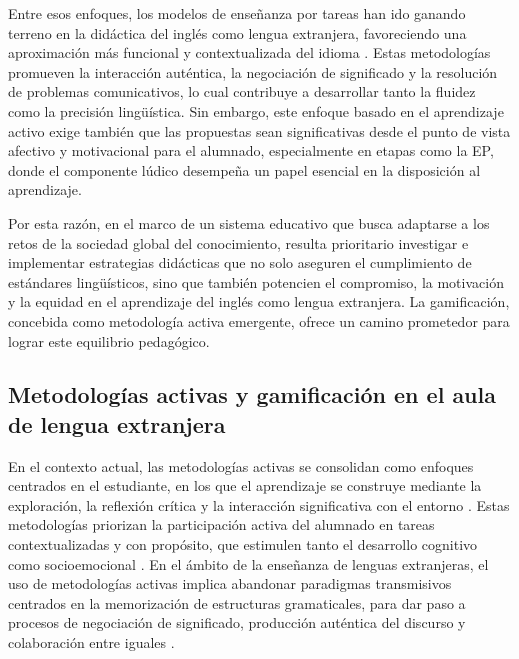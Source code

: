 \documentclass[spanish]{textolivre}
\begin{document}
Entre esos enfoques, los modelos de enseñanza por tareas han ido ganando terreno en la didáctica del inglés como lengua extranjera, favoreciendo una aproximación más funcional y contextualizada del idioma \cite{cambridge2011}. Estas metodologías promueven la interacción auténtica, la negociación de significado y la resolución de problemas comunicativos, lo cual contribuye a desarrollar tanto la fluidez como la precisión lingüística. Sin embargo, este enfoque basado en el aprendizaje activo exige también que las propuestas sean significativas desde el punto de vista afectivo y motivacional para el alumnado, especialmente en etapas como la EP, donde el componente lúdico desempeña un papel esencial en la disposición al aprendizaje.

Por esta razón, en el marco de un sistema educativo que busca adaptarse a los retos de la sociedad global del conocimiento, resulta prioritario investigar e implementar estrategias didácticas que no solo aseguren el cumplimiento de estándares lingüísticos, sino que también potencien el compromiso, la motivación y la equidad en el aprendizaje del inglés como lengua extranjera. La gamificación, concebida como metodología activa emergente, ofrece un camino prometedor para lograr este equilibrio pedagógico.

\subsection{Metodologías activas y gamificación en el aula de lengua extranjera}
En el contexto actual, las metodologías activas se consolidan como enfoques centrados en el estudiante, en los que el aprendizaje se construye mediante la exploración, la reflexión crítica y la interacción significativa con el entorno \cite{silva2017}. Estas metodologías priorizan la participación activa del alumnado en tareas contextualizadas y con propósito, que estimulen tanto el desarrollo cognitivo como socioemocional \cite{londono2020}. En el ámbito de la enseñanza de lenguas extranjeras, el uso de metodologías activas implica abandonar paradigmas transmisivos centrados en la memorización de estructuras gramaticales, para dar paso a procesos de negociación de significado, producción auténtica del discurso y colaboración entre iguales \cite{alvarez2021}.
\end{document}
